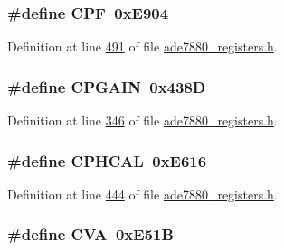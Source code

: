 \hypertarget{a00036_ac872290e70cb6bf2b018d9e6b441216b}{
\subsubsection[{C\-P\-F}]{\setlength{\rightskip}{0pt plus 5cm}\#define C\-P\-F~0x\-E904}}\label{de/d8c/a00036_ac872290e70cb6bf2b018d9e6b441216b}


Definition at line \hyperlink{a00036_source_l00491}{491} of file \hyperlink{a00036_source}{ade7880\-\_\-registers.\-h}.

\hypertarget{a00036_aa3cfe8257b2ce2609bc10431cf461e2c}{
\subsubsection[{C\-P\-G\-A\-I\-N}]{\setlength{\rightskip}{0pt plus 5cm}\#define C\-P\-G\-A\-I\-N~0x438\-D}}\label{de/d8c/a00036_aa3cfe8257b2ce2609bc10431cf461e2c}


Definition at line \hyperlink{a00036_source_l00346}{346} of file \hyperlink{a00036_source}{ade7880\-\_\-registers.\-h}.

\hypertarget{a00036_a5da995ba3336521304ed284d12177ca9}{
\subsubsection[{C\-P\-H\-C\-A\-L}]{\setlength{\rightskip}{0pt plus 5cm}\#define C\-P\-H\-C\-A\-L~0x\-E616}}\label{de/d8c/a00036_a5da995ba3336521304ed284d12177ca9}


Definition at line \hyperlink{a00036_source_l00444}{444} of file \hyperlink{a00036_source}{ade7880\-\_\-registers.\-h}.

\hypertarget{a00036_ac1b321e92c8fb61be50f9cc733df7aaf}{
\subsubsection[{C\-V\-A}]{\setlength{\rightskip}{0pt plus 5cm}\#define C\-V\-A~0x\-E51\-B}}\label{de/d8c/a00036_ac1b321e92c8fb61be50f9cc733df7aaf}


